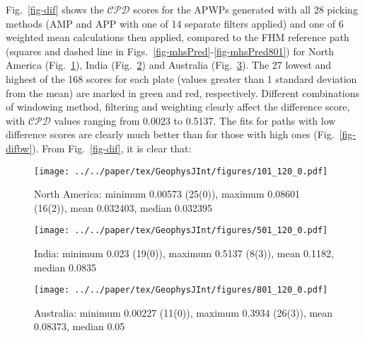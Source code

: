 Fig.~\ref{fig-dif} shows the $\mathcal{CPD}$ scores for the APWPs generated with
all 28 picking methods (AMP and APP with one of 14 separate filters applied) and
one of 6 weighted mean calculations then applied, compared to the FHM reference
path (squares and dashed line in Figs.~\ref{fig-mhsPred}-\ref{fig-mhsPred801})
for North America (Fig.~\ref{fig-na-dif}), India (Fig.~\ref{fig-in-dif}) and
Australia (Fig.~\ref{fig-au-dif}). The 27 lowest and highest of the 168
scores for each plate (values greater than 1 standard deviation from the mean)
are marked in green and red, respectively. Different combinations of windowing
method, filtering and weighting clearly affect the difference score, with
$\mathcal{CPD}$ values ranging from 0.0023 to 0.5137. The fits for paths with
low difference scores are clearly much better than for those with high ones
(Fig.~\ref{fig-difbw}). From Fig.~\ref{fig-dif}, it is clear that:

\begin{figure*}
  \vspace*{-1.1cm}
	\centering
	\begin{subfigure}{.94\textwidth}
		\texttt{[image: ../../paper/tex/GeophysJInt/figures/101\_120\_0.pdf]}
		\caption{North America: minimum 0.00573 (25(0)), maximum
		0.08601 (16(2)), mean 0.032403, median 0.032395}\label{fig-na-dif} %
	\end{subfigure}
	\vspace{.1em} %
	\begin{subfigure}{.94\textwidth}
		\texttt{[image: ../../paper/tex/GeophysJInt/figures/501\_120\_0.pdf]}
		\caption{India: minimum 0.023 (19(0)), maximum 0.5137 (8(3)),
		mean 0.1182, median 0.0835}\label{fig-in-dif} %
	\end{subfigure}
	\vspace{.1em}
	\begin{subfigure}{.94\textwidth}
		\texttt{[image: ../../paper/tex/GeophysJInt/figures/801\_120\_0.pdf]}
		\caption{Australia: minimum 0.00227 (11(0)), maximum
		0.3934 (26(3)), mean 0.08373, median 0.05}\label{fig-au-dif} %
	\end{subfigure}
	\caption[$\mathcal{CPD}$ of each plate's paleomagnetic APWPs vs its FHM
predicted APWP]{Equal-weight composite path difference ($\mathcal{CPD}$) values
between each continent's paleomagnetic APWPs and its predicted APWP from FHM and
related plate circuits. The paths are in 10 Myr bin and 5 Myr step. The
difference values less than one-standard-deviation interval of the whole 168
values (lower 15.866 per cent) are colored in green, more than
one-standard-deviation interval (upper 15.866 per cent) colored in red. Exactly
the same columns are connected. The percentages of removed paleopoles are
derived relative to Pk 1, corrected relative to each corresponding picking
method (Pk 8,9, 12,13; 1 paleopole removed and 1 corrected by Pk 20,21 for
India). Fit quality (FQ) for each score is color coded.}\label{fig-dif} %
\end{figure*}

